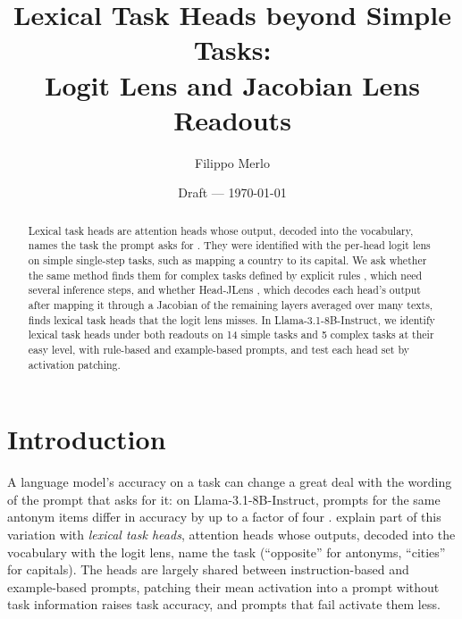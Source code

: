 \documentclass[11pt,a4paper]{article}
\title{Lexical Task Heads beyond Simple Tasks:\\ Logit Lens and Jacobian Lens Readouts}
\author{Filippo Merlo}
\date{Draft --- \today}
\begin{document}
\maketitle

\begin{abstract}
\label{sec:abstract}
Lexical task heads are attention heads whose output, decoded into the vocabulary, names the task the prompt asks for \citep{yang2026shared}. They were identified with the per-head logit lens on simple single-step tasks, such as mapping a country to its capital. We ask whether the same method finds them for complex tasks defined by explicit rules \citep{fu2026rules}, which need several inference steps, and whether Head-JLens \citep{merlo2026headjlens}, which decodes each head's output after mapping it through a Jacobian of the remaining layers averaged over many texts, finds lexical task heads that the logit lens misses. In Llama-3.1-8B-Instruct, we identify lexical task heads under both readouts on 14 simple tasks and 5 complex tasks at their easy level, with rule-based and example-based prompts, and test each head set by activation patching.
\end{abstract}

\section{Introduction}\label{sec:intro}
A language model's accuracy on a task can change a great deal with the wording of the prompt that asks for it: on Llama-3.1-8B-Instruct, prompts for the same antonym items differ in accuracy by up to a factor of four \citep[Fig.~1]{yang2026shared}. \citet{yang2026shared} explain part of this variation with \emph{lexical task heads}, attention heads whose outputs, decoded into the vocabulary with the logit lens, name the task (``opposite'' for antonyms, ``cities'' for capitals). The heads are largely shared between instruction-based and example-based prompts, patching their mean activation into a prompt without task information raises task accuracy, and prompts that fail activate them less.
\end{document}

